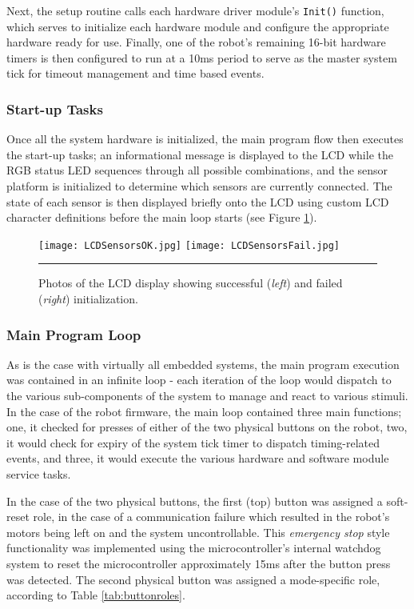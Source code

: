 Next, the setup routine calls each hardware driver module's \lstinline{Init()} function, which serves to initialize each hardware module and configure the appropriate hardware ready for use. Finally, one of the robot's remaining 16-bit hardware timers is then configured to run at a 10ms period to serve as the master system tick for timeout management and time based events.

\FloatBarrier
\subsubsection{Start-up Tasks}

Once all the system hardware is initialized, the main program flow then executes the start-up tasks; an informational message is displayed to the LCD while the RGB status LED sequences through all possible combinations, and the sensor platform is initialized to determine which sensors are currently connected. The state of each sensor is then displayed briefly onto the LCD using custom LCD character definitions before the main loop starts (see Figure \ref{fig:sensorinitlcd}).

\begin{figure}[tbph]
	\vspace{1em}
	\centering
		\texttt{[image: LCDSensorsOK.jpg]}
		\texttt{[image: LCDSensorsFail.jpg]}
	\rule{35em}{0.5pt}
	\caption[LCD Sensor Status Information]{Photos of the LCD display showing successful (\textit{left}) and failed (\textit{right}) initialization.}
	\label{fig:sensorinitlcd}
\end{figure}

\FloatBarrier
\subsubsection{Main Program Loop}

As is the case with virtually all embedded systems, the main program execution was contained in an infinite loop - each iteration of the loop would dispatch to the various sub-components of the system to manage and react to various stimuli. In the case of the robot firmware, the main loop contained three main functions; one, it checked for presses of either of the two physical buttons on the robot, two, it would check for expiry of the system tick timer to dispatch timing-related events, and three, it would execute the various hardware and software module service tasks.

In the case of the two physical buttons, the first (top) button was assigned a soft-reset role, in the case of a communication failure which resulted in the robot's motors being left on and the system uncontrollable. This \textit{emergency stop} style functionality was implemented using the microcontroller's internal watchdog system to reset the microcontroller approximately 15ms after the button press was detected. The second physical button was assigned a mode-specific role, according to Table \ref{tab:buttonroles}.

